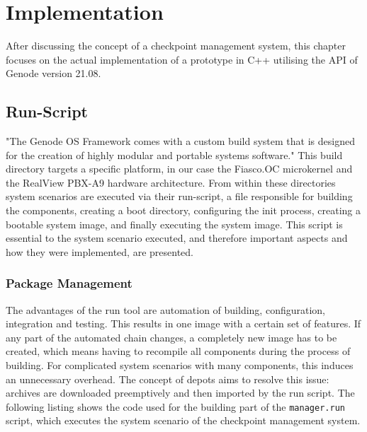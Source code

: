 
\chapter{Implementation}\label{chapter:implementation}
After discussing the concept of a checkpoint management system, this chapter focuses on the actual implementation of a prototype in C++ utilising the API of Genode version 21.08. 
\section{Run-Script}
"The Genode OS Framework comes with a custom build system that is designed for the creation of highly modular and portable systems software." \cite{build_system} This build directory targets a specific platform, in our case the Fiasco.OC microkernel and the RealView PBX-A9 hardware architecture. From within these directories system scenarios are executed via their run-script, a file responsible for building the components, creating a boot directory, configuring the init process, creating a bootable system image, and finally executing the system image. \cite{build_system}
This script is essential to the system scenario executed, and therefore important aspects and how they were implemented, are presented.
\subsection{Package Management}
The advantages of the run tool are automation of building, configuration, integration and testing. This results in one image with a certain set of features. If any part of the automated chain changes, a completely new image has to be created, which means having to recompile all components during the process of building. For complicated system scenarios with many components, this induces an unnecessary overhead. The concept of depots aims to resolve this issue: archives are downloaded preemptively and then imported by the run script. \cite{package_management} The following listing shows the code used for the building part of the \verb|manager.run| script, which executes the system scenario of the checkpoint management system.

